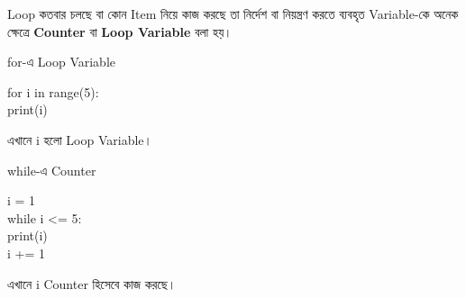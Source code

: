 

Loop কতবার চলছে বা কোন Item নিয়ে কাজ করছে তা নির্দেশ বা
নিয়ন্ত্রণ করতে ব্যবহৃত Variable-কে অনেক ক্ষেত্রে
\textbf{Counter} বা \textbf{Loop Variable} বলা হয়।

\noindent
\begin{minipage}[t]{0.49\linewidth}

\begin{sideexamplebox}{\textenglish{\ttfamily for}-এ Loop Variable}

\begin{sidecodebox}
\begin{english}
\ttfamily
for i in range(5):\\
\hspace*{4mm}print(i)
\end{english}
\end{sidecodebox}

এখানে
\textenglish{\ttfamily i}
হলো Loop Variable।

\end{sideexamplebox}

\end{minipage}
\hfill
\begin{minipage}[t]{0.49\linewidth}

\begin{sideexamplebox}{\textenglish{\ttfamily while}-এ Counter}

\begin{sidecodebox}
\begin{english}
\ttfamily
i = 1\\
while i <= 5:\\
\hspace*{4mm}print(i)\\
\hspace*{4mm}i += 1
\end{english}
\end{sidecodebox}

এখানে
\textenglish{\ttfamily i}
Counter হিসেবে কাজ করছে।

\end{sideexamplebox}

\end{minipage}



